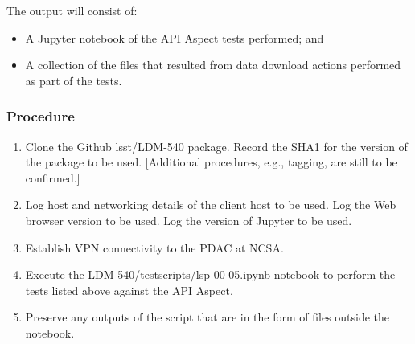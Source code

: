 The output will consist of:

\begin{itemize}
  \item{A Jupyter notebook of the API Aspect tests performed; and}
  \item{A collection of the files that resulted from data download actions performed as part of the tests.}
\end{itemize}


\subsubsection{Procedure}

\begin{enumerate}

  \item{Clone the Github lsst/LDM-540 package.  Record the SHA1 for the version of the package to be used.  [Additional procedures, e.g., tagging, are still to be confirmed.]}
  \item{Log host and networking details of the client host to be used.
 Log the Web browser version to be used.
 Log the version of Jupyter to be used.}
  \item{Establish VPN connectivity to the PDAC at NCSA.}
  \item{Execute the LDM-540/test\textunderscore scripts/lsp-00-05.ipynb notebook to perform the tests listed above against the API Aspect.}
  \item{Preserve any outputs of the script that are in the form of files outside the notebook.}

\end{enumerate}
